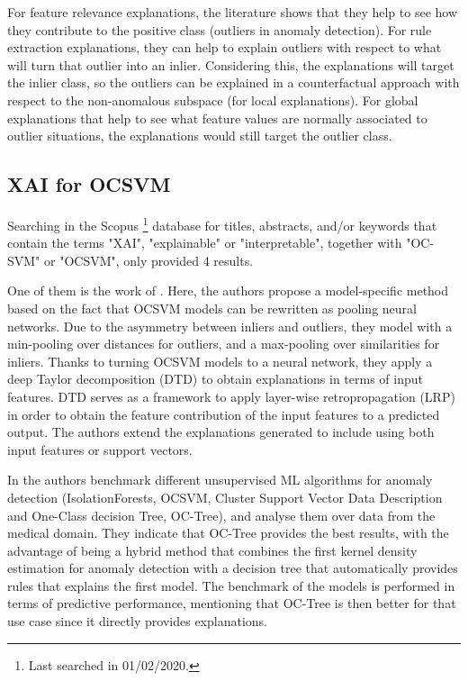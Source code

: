 For feature relevance explanations, the literature shows that they help to see how they contribute to the positive class (outliers in anomaly detection). For rule extraction explanations, they can help to explain outliers with respect to what will turn that outlier into an inlier. Considering this, the explanations will target the inlier class, so the outliers can be explained in a counterfactual approach with respect to the non-anomalous subspace (for local explanations). For global explanations that help to see what feature values are normally associated to outlier situations, the explanations would still target the outlier class.


\subsection{XAI for OCSVM}\label{subsec:ch2-sota-xai-oscvm}
Searching in the Scopus\textsuperscript{\textregistered} \footnote{Last searched in 01/02/2020.} database for titles, abstracts, and/or keywords that contain the terms "XAI", "explainable" or "interpretable", together with "OC-SVM" or "OCSVM", only provided 4 results.

One of them is the work of \parencite{kauffmann2020towards}. Here, the authors propose a model-specific method based on the fact that OCSVM models can be rewritten as pooling neural networks. Due to the asymmetry between inliers and outliers, they model with a min-pooling over distances for outliers, and a max-pooling over similarities for inliers. Thanks to turning OCSVM models to a neural network, they apply a deep Taylor decomposition (DTD) to obtain explanations in terms of input features. DTD serves as a framework to apply layer-wise retropropagation (LRP) in order to obtain the feature contribution of the input features to a predicted output. The authors extend the explanations generated to include using both input features or support vectors. 

In \parencite{itani2020one} the authors benchmark different unsupervised ML algorithms for anomaly detection (IsolationForests, OCSVM, Cluster Support Vector Data Description and One-Class decision Tree, OC-Tree), and analyse them over data from the medical domain. They indicate that OC-Tree provides the best results, with the advantage of being a hybrid method that combines the first kernel density estimation for anomaly detection with a decision tree that automatically provides rules that explains the first model. The benchmark of the models is performed in terms of predictive performance, mentioning that OC-Tree is then better for that use case since it directly provides explanations.

